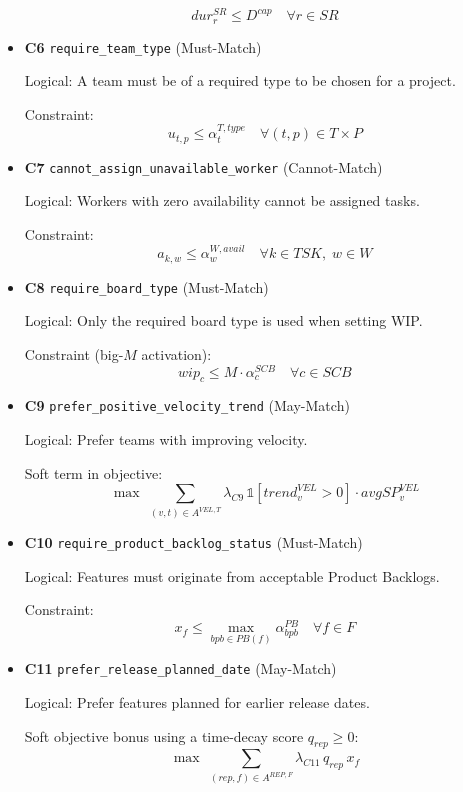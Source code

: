 \documentclass[11pt,a4paper]{article}
\begin{document}
\begin{itemize}[leftmargin=2em]
        \[
          dur^{SR}_r \le D^{cap} \quad \forall r\in SR
        \]
  \item \textbf{C6} \texttt{require\_team\_type} (Must-Match)\par
        Logical: A team must be of a required type to be chosen for a project.\par
        Constraint:
        \[
          u_{t,p} \le \alpha^{T,type}_t \quad \forall (t,p)\in T\times P
        \]
  \item \textbf{C7} \texttt{cannot\_assign\_unavailable\_worker} (Cannot-Match)\par
        Logical: Workers with zero availability cannot be assigned tasks.\par
        Constraint:
        \[
          a_{k,w} \le \alpha^{W,avail}_w \quad \forall k\in TSK,\; w\in W
        \]
  \item \textbf{C8} \texttt{require\_board\_type} (Must-Match)\par
        Logical: Only the required board type is used when setting WIP.\par
        Constraint (big-$M$ activation):
        \[
          wip_{c} \le M \cdot \alpha^{SCB}_c \quad \forall c\in SCB
        \]
  \item \textbf{C9} \texttt{prefer\_positive\_velocity\_trend} (May-Match)\par
        Logical: Prefer teams with improving velocity.\par
        Soft term in objective:
        \[
          \max \; \sum_{(v,t)\in A^{VEL,T}} \lambda_{C9}\, \mathbb{1}[trend^{VEL}_v>0]\cdot avgSP^{VEL}_v
        \]
  \item \textbf{C10} \texttt{require\_product\_backlog\_status} (Must-Match)\par
        Logical: Features must originate from acceptable Product Backlogs.\par
        Constraint:
        \[
          x_f \le \max_{bpb\in PB(f)} \alpha^{PB}_{bpb} \quad \forall f\in F
        \]
  \item \textbf{C11} \texttt{prefer\_release\_planned\_date} (May-Match)\par
        Logical: Prefer features planned for earlier release dates.\par
        Soft objective bonus using a time-decay score $q_{rep}\ge 0$:
        \[
          \max \; \sum_{(rep,f)\in A^{REP,F}} \lambda_{C11}\, q_{rep}\, x_f
        \]
\end{itemize}
\end{document}
